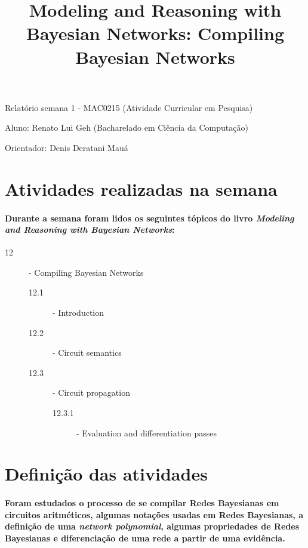 \documentclass[a4paper,10pt]{article}
\title{\textbf{Modeling and Reasoning with Bayesian Networks: Compiling Bayesian Networks}}
\theoremstyle{plain}
\begin{document}
\date{}
\author{}
\vspace*{-40pt}
{\let\newpage\relax\maketitle}

Relatório semana 1 - MAC0215 (Atividade Curricular em Pesquisa)

Aluno: Renato Lui Geh (Bacharelado em Ciência da Computação)

Orientador: Denis Deratani Mauá

\section{Atividades realizadas na semana}

\paragraph{
  Durante a semana foram lidos os seguintes tópicos do livro \textit{Modeling and Reasoning with
Bayesian Networks}\cite{bayes-net-darwiche}:
}

\begin{description}
  \item[12] - Compiling Bayesian Networks
  \begin{description}
    \item[12.1] - Introduction
    \item[12.2] - Circuit semantics
    \item[12.3] - Circuit propagation
    \begin{description}
      \item[12.3.1] - Evaluation and differentiation passes
    \end{description}
  \end{description}
\end{description}

\section{Definição das atividades}

\paragraph{
  Foram estudados o processo de se compilar Redes Bayesianas em circuitos aritméticos, algumas
notações usadas em Redes Bayesianas, a definição de uma \textit{network polynomial}, algumas
propriedades de Redes Bayesianas e diferenciação de uma rede a partir de uma evidência.
}
\end{document}
